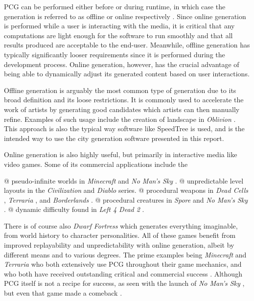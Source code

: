 PCG can be performed either before or during runtime, in which case the generation is referred to as offline or online respectively \cite[p. 7-8]{pcg_in_games}.
Since online generation is performed while a user is interacting with the media, it is critical that any computations are light enough for the software to run smoothly and that all results produced are acceptable to the end-user.
Meanwhile, offline generation has typically significantly looser requirements since it is performed during the development process.
Online generation, however, has the crucial advantage of being able to dynamically adjust its generated content based on user interactions.

Offline generation is arguably the most common type of generation due to its broad definition and its loose restrictions.
It is commonly used to accelerate the work of artists by generating good candidates which artists can then manually refine. Examples of such usage include the creation of landscape in \textit{Oblivion} \cite{elder_scrolls_iv}.
This approach is also the typical way software like SpeedTree \cite{speedtree} is used, and is the intended way to use the city generation software presented in this report.

Online generation is also highly useful, but primarily in interactive media like video games.
Some of its commercial applications include the
\begin{easylist}
  @ pseudo-infinite worlds in \textit{Minecraft} \cite{minecraft} and \textit{No Man's Sky} \cite{no_man_sky}.
  @ unpredictable level layouts in the \textit{Civilization} \cite{civilization} and \textit{Diablo} \cite{diablo} series.
  @ procedural weapons in \textit{Dead Cells} \cite{dead_cells}, \textit{Terraria} \cite{terraria}, and \textit{Borderlands} \cite{borderlands}.
  @ procedural creatures in \textit{Spore} \cite{spore} and \textit{No Man's Sky} \cite{no_man_sky}.
  @ dynamic difficulty found in \textit{Left 4 Dead 2} \cite{left_4_dead_2}.
\end{easylist}
There is of course also \textit{Dwarf Fortress} \cite{dwarf_fortress} which generates everything imaginable, from world history to character personalities.
All of these games benefit from improved replayability and unpredictability with online generation, albeit by different means and to various degrees.
The prime examples being \textit{Minecraft} and \textit{Terraria} who both extensively use PCG throughout their game mechanics, and who both have received outstanding critical and commercial success \cite{minecraft_reviews} \cite{minecraft_commercial} \cite{terraria_reviews} \cite{terraria_commercial}.
Although PCG itself is not a recipe for success, as seen with the launch of \textit{No Man's Sky} \cite{no_man_sky_launch}, but even that game made a comeback \cite{no_man_sky_comeback}.


